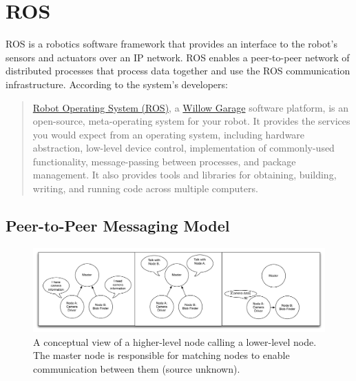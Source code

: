 \section{ROS}

ROS is a robotics software framework that provides an interface to the
robot's sensors and actuators over an IP network. ROS enables a
peer-to-peer network of distributed processes that process data
together and use the ROS communication infrastructure.  According to
the system's developers:
 
\begin{quote}
\href{http://www.ros.org/wiki/ROS/StartGuide}{Robot Operating System (ROS)}, a \href{http://www.willowgarage.com/}{Willow Garage} software platform, is an open-source, meta-operating system for your robot. It provides the services you would expect from an operating system, including hardware abstraction, low-level device control, implementation of commonly-used functionality, message-passing between processes, and package management. It also provides tools and libraries for obtaining, building, writing, and running code across multiple computers. 
\end{quote}

\subsection{Peer-to-Peer Messaging Model}

\begin{figure}[!ht]
\centering
\includegraphics[width=39pc]{figures/3_rosmaster.pdf}
\caption{\label{fig:master} A conceptual view of a higher-level node calling a lower-level node. The master node is responsible for matching nodes to enable communication between them (source unknown).}
\end{figure}

